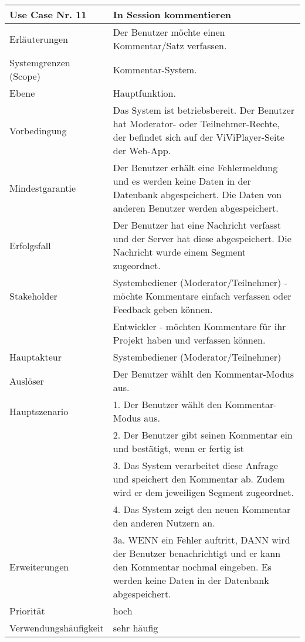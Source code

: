 \begin{tabularx}{\linewidth}{|l|X|}
	\hline
	Use Case Nr. 11			& \textbf{In Session kommentieren} \\ \hline
	Erläuterungen			& Der Benutzer möchte einen Kommentar/Satz verfassen. \\ \hline
	Systemgrenzen (Scope)	& Kommentar-System. \\ \hline
	Ebene					& Hauptfunktion. \\ \hline
	Vorbedingung			& Das System ist betriebsbereit. Der Benutzer hat Moderator- oder 
							  Teilnehmer-Rechte, der befindet sich auf der ViViPlayer-Seite der Web-App. \\ \hline
	Mindestgarantie			& Der Benutzer erhält eine Fehlermeldung und es werden keine Daten 
							  in der Datenbank abgespeichert. Die Daten von anderen Benutzer werden abgespeichert. \\ \hline
	Erfolgsfall				& Der Benutzer hat eine Nachricht verfasst und der Server hat 
							  diese abgespeichert. Die Nachricht wurde einem Segment zugeordnet.\\ \hline
	Stakeholder				& Systembediener (Moderator/Teilnehmer) - möchte Kommentare einfach 
							  verfassen oder Feedback geben können.\\ 
                            & Entwickler - möchten Kommentare für ihr Projekt haben und 
                              verfassen können. \\ \hline
	Hauptakteur				& Systembediener (Moderator/Teilnehmer) \\ \hline
	Auslöser				& Der Benutzer wählt den Kommentar-Modus aus. \\ \hline	
	Hauptszenario			& 1. Der Benutzer wählt den Kommentar-Modus aus. \\
                            & 2. Der Benutzer gibt seinen Kommentar ein und bestätigt, wenn er 
                              fertig ist\\
							& 3. Das System verarbeitet diese Anfrage und speichert den 
							  Kommentar ab. Zudem wird er dem jeweiligen Segment zugeordnet. \\
							& 4. Das System zeigt den neuen Kommentar den anderen Nutzern an. \\ \hline
	Erweiterungen			& 3a. WENN ein Fehler auftritt, DANN wird der Benutzer 
							  benachrichtigt und er kann den Kommentar nochmal eingeben. Es werden keine Daten in der Datenbank abgespeichert.\\ \hline
	Priorität				& hoch \\ \hline
	Verwendungshäufigkeit	& sehr häufig \\ \hline
\end{tabularx}
